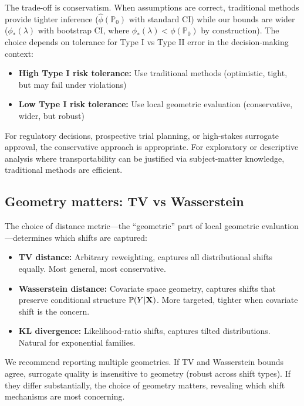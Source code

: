 \documentclass{article}
\newcommand{\PP}{\mathbb{P}}
\begin{document}
The trade-off is conservatism. When assumptions are correct, traditional methods provide tighter inference ($\hat{\phi}(\PP_0)$ with standard CI) while our bounds are wider ($\phi_*(\lambda)$ with bootstrap CI, where $\phi_*(\lambda) < \phi(\PP_0)$ by construction). The choice depends on tolerance for Type I vs Type II error in the decision-making context:

\begin{itemize}
    \item \textbf{High Type I risk tolerance:} Use traditional methods (optimistic, tight, but may fail under violations)
    \item \textbf{Low Type I risk tolerance:} Use local geometric evaluation (conservative, wider, but robust)
\end{itemize}

For regulatory decisions, prospective trial planning, or high-stakes surrogate approval, the conservative approach is appropriate. For exploratory or descriptive analysis where transportability can be justified via subject-matter knowledge, traditional methods are efficient.

\subsection{Geometry matters: TV vs Wasserstein}

The choice of distance metric---the ``geometric'' part of local geometric evaluation---determines which shifts are captured:

\begin{itemize}
    \item \textbf{TV distance:} Arbitrary reweighting, captures all distributional shifts equally. Most general, most conservative.
    \item \textbf{Wasserstein distance:} Covariate space geometry, captures shifts that preserve conditional structure $\PP(Y|\bX)$. More targeted, tighter when covariate shift is the concern.
    \item \textbf{KL divergence:} Likelihood-ratio shifts, captures tilted distributions. Natural for exponential families.
\end{itemize}

We recommend reporting multiple geometries. If TV and Wasserstein bounds agree, surrogate quality is insensitive to geometry (robust across shift types). If they differ substantially, the choice of geometry matters, revealing which shift mechanisms are most concerning.
\end{document}
